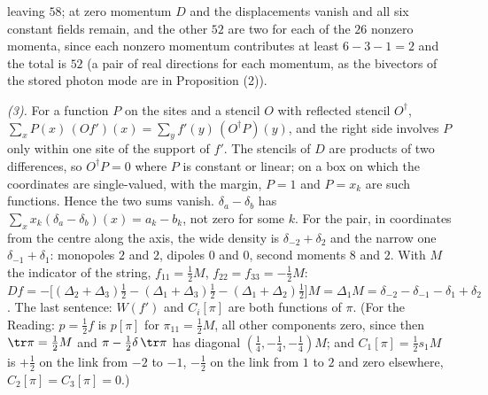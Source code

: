 leaving $58$; at zero momentum $D$ and the displacements vanish and all six constant fields remain, and the other $52$ are two for each of the $26$ nonzero momenta, since each nonzero momentum contributes at least $6 - 3 - 1 = 2$ and the total is $52$ (a pair of real directions for each momentum, as the bivectors of the stored photon mode are in Proposition (2)).

\emph{(3).} For a function $P$ on the sites and a stencil $O$ with reflected stencil $O^{\dagger}$, $\sum_{x}P(x)\,(Of')(x) = \sum_{y}f'(y)\,(O^{\dagger}P)(y)$, and the right side involves $P$ only within one site of the support of $f'$. The stencils of $D$ are products of two differences, so $O^{\dagger}P = 0$ where $P$ is constant or linear; on a box on which the coordinates are single-valued, with the margin, $P = 1$ and $P = x_{k}$ are such functions. Hence the two sums vanish. $\delta_{a} - \delta_{b}$ has $\sum_{x}x_{k}(\delta_{a} - \delta_{b})(x) = a_{k} - b_{k}$, not zero for some $k$. For the pair, in coordinates from the centre along the axis, the wide density is $\delta_{-2} + \delta_{2}$ and the narrow one $\delta_{-1} + \delta_{1}$: monopoles $2$ and $2$, dipoles $0$ and $0$, second moments $8$ and $2$. With $M$ the indicator of the string, $f_{11} = \tfrac12 M$, $f_{22} = f_{33} = -\tfrac12 M$: $Df = -\bigl[(\Delta_{2} + \Delta_{3})\tfrac12 - (\Delta_{1} + \Delta_{3})\tfrac12 - (\Delta_{1} + \Delta_{2})\tfrac12\bigr]M = \Delta_{1}M = \delta_{-2} - \delta_{-1} - \delta_{1} + \delta_{2}$. The last sentence: $W(f')$ and $C_{i}[\pi]$ are both functions of $\pi$. (For the Reading: $p = \tfrac12 f$ is $p[\pi]$ for $\pi_{11} = \tfrac12 M$, all other components zero, since then $\tr\pi = \tfrac12 M$ and $\pi - \tfrac12\delta\,\tr\pi$ has diagonal $(\tfrac14, -\tfrac14, -\tfrac14)M$; and $C_{1}[\pi] = \tfrac12 s_{1}M$ is $+\tfrac12$ on the link from $-2$ to $-1$, $-\tfrac12$ on the link from $1$ to $2$ and zero elsewhere, $C_{2}[\pi] = C_{3}[\pi] = 0$.)

